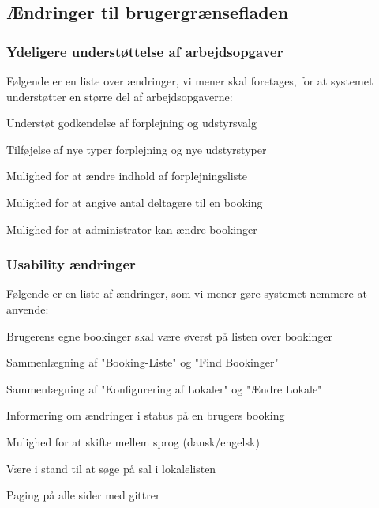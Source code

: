 \subsection{Ændringer til brugergrænsefladen}
\label{Evaluation_Future_GUI}
\subsubsection{Ydeligere understøttelse af arbejdsopgaver}
Følgende er en liste over ændringer, vi mener skal foretages, for at systemet understøtter en større del af arbejdsopgaverne:
\begin{my_itemize}
\item Understøt godkendelse af forplejning og udstyrsvalg
\item Tilføjelse af nye typer forplejning og nye udstyrstyper
\item Mulighed for at ændre indhold af forplejningsliste
\item Mulighed for at angive antal deltagere til en booking
\item Mulighed for at administrator kan ændre bookinger
\end{my_itemize}

\subsubsection{Usability ændringer}
Følgende er en liste af ændringer, som vi mener gøre systemet nemmere at anvende:
\begin{my_itemize}
\item Brugerens egne bookinger skal være øverst på listen over bookinger
\item Sammenlægning af "Booking-Liste" og "Find Bookinger"
\item Sammenlægning af "Konfigurering af Lokaler" og "Ændre Lokale"
\item Informering om ændringer i status på en brugers booking
\item Mulighed for at skifte mellem sprog (dansk/engelsk)
\item Være i stand til at søge på sal i lokalelisten
\item Paging på alle sider med gittrer
\end{my_itemize}
